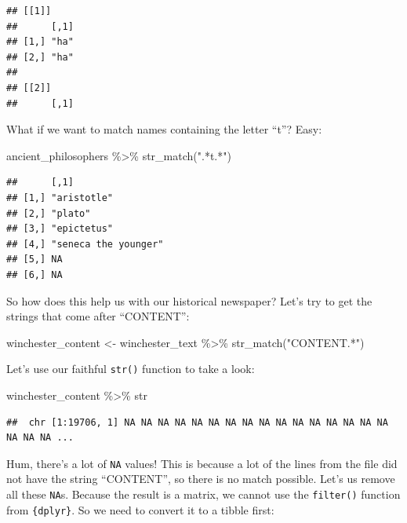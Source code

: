 \documentclass[
]{article}
\newenvironment{Shaded}{\begin{snugshade}}{\end{snugshade}}
\newcommand{\FunctionTok}[1]{\textcolor[rgb]{0.00,0.00,0.00}{#1}}
\newcommand{\NormalTok}[1]{#1}
\newcommand{\OtherTok}[1]{\textcolor[rgb]{0.56,0.35,0.01}{#1}}
\newcommand{\SpecialCharTok}[1]{\textcolor[rgb]{0.00,0.00,0.00}{#1}}
\newcommand{\StringTok}[1]{\textcolor[rgb]{0.31,0.60,0.02}{#1}}
\begin{document}
\begin{verbatim}
## [[1]]
##      [,1]
## [1,] "ha"
## [2,] "ha"
## 
## [[2]]
##      [,1]
\end{verbatim}

What if we want to match names containing the letter ``t''? Easy:

\begin{Shaded}
\begin{Highlighting}[]
\NormalTok{ancient\_philosophers }\SpecialCharTok{\%\textgreater{}\%}
  \FunctionTok{str\_match}\NormalTok{(}\StringTok{".*t.*"}\NormalTok{)}
\end{Highlighting}
\end{Shaded}

\begin{verbatim}
##      [,1]                
## [1,] "aristotle"         
## [2,] "plato"             
## [3,] "epictetus"         
## [4,] "seneca the younger"
## [5,] NA                  
## [6,] NA
\end{verbatim}

So how does this help us with our historical newspaper? Let's try to get the strings that come
after ``CONTENT'':

\begin{Shaded}
\begin{Highlighting}[]
\NormalTok{winchester\_content }\OtherTok{\textless{}{-}}\NormalTok{ winchester\_text }\SpecialCharTok{\%\textgreater{}\%}
  \FunctionTok{str\_match}\NormalTok{(}\StringTok{"CONTENT.*"}\NormalTok{)}
\end{Highlighting}
\end{Shaded}

Let's use our faithful \texttt{str()} function to take a look:

\begin{Shaded}
\begin{Highlighting}[]
\NormalTok{winchester\_content }\SpecialCharTok{\%\textgreater{}\%}
\NormalTok{  str}
\end{Highlighting}
\end{Shaded}

\begin{verbatim}
##  chr [1:19706, 1] NA NA NA NA NA NA NA NA NA NA NA NA NA NA NA NA NA NA NA ...
\end{verbatim}

Hum, there's a lot of \texttt{NA} values! This is because a lot of the lines from the file did not have the
string ``CONTENT'', so there is no match possible. Let's us remove all these \texttt{NA}s. Because the
result is a matrix, we cannot use the \texttt{filter()} function from \texttt{\{dplyr\}}. So we need to convert it
to a tibble first:
\end{document}

